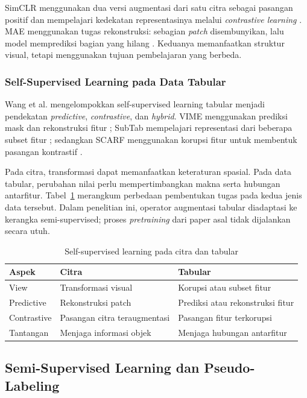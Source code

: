 SimCLR menggunakan dua versi augmentasi dari satu citra sebagai pasangan positif dan mempelajari kedekatan representasinya melalui \textit{contrastive learning} \cite{ref2}. MAE menggunakan tugas rekonstruksi: sebagian \textit{patch} disembunyikan, lalu model memprediksi bagian yang hilang \cite{ref3}. Keduanya memanfaatkan struktur visual, tetapi menggunakan tujuan pembelajaran yang berbeda.

\subsubsection{Self-Supervised Learning pada Data Tabular}

Wang et al. \cite{ref4} mengelompokkan self-supervised learning tabular menjadi pendekatan \textit{predictive}, \textit{contrastive}, dan \textit{hybrid}. VIME menggunakan prediksi mask dan rekonstruksi fitur \cite{ref5}; SubTab mempelajari representasi dari beberapa subset fitur \cite{ref6}; sedangkan SCARF menggunakan korupsi fitur untuk membentuk pasangan kontrastif \cite{ref7}.

Pada citra, transformasi dapat memanfaatkan keteraturan spasial. Pada data tabular, perubahan nilai perlu mempertimbangkan makna serta hubungan antarfitur. Tabel~\ref{tab:ii} merangkum perbedaan pembentukan tugas pada kedua jenis data tersebut. Dalam penelitian ini, operator augmentasi tabular diadaptasi ke kerangka semi-supervised; proses \textit{pretraining} dari paper asal tidak dijalankan secara utuh.

\begin{table}[!htbp]
\caption{Self-supervised learning pada citra dan tabular}
\label{tab:ii}
\centering
\footnotesize
\setlength{\tabcolsep}{3pt}
\renewcommand{\arraystretch}{1.1}
\begin{tabularx}{\columnwidth}{p{}XX}
\hline
\textbf{Aspek} & \textbf{Citra} & \textbf{Tabular} \\
\hline
View & Transformasi visual & Korupsi atau subset fitur \\
Predictive & Rekonstruksi patch & Prediksi atau rekonstruksi fitur \\
Contrastive & Pasangan citra teraugmentasi & Pasangan fitur terkorupsi \\
Tantangan & Menjaga informasi objek & Menjaga hubungan antarfitur \\
\hline
\end{tabularx}
\end{table}

\subsection{Semi-Supervised Learning dan Pseudo-Labeling}

